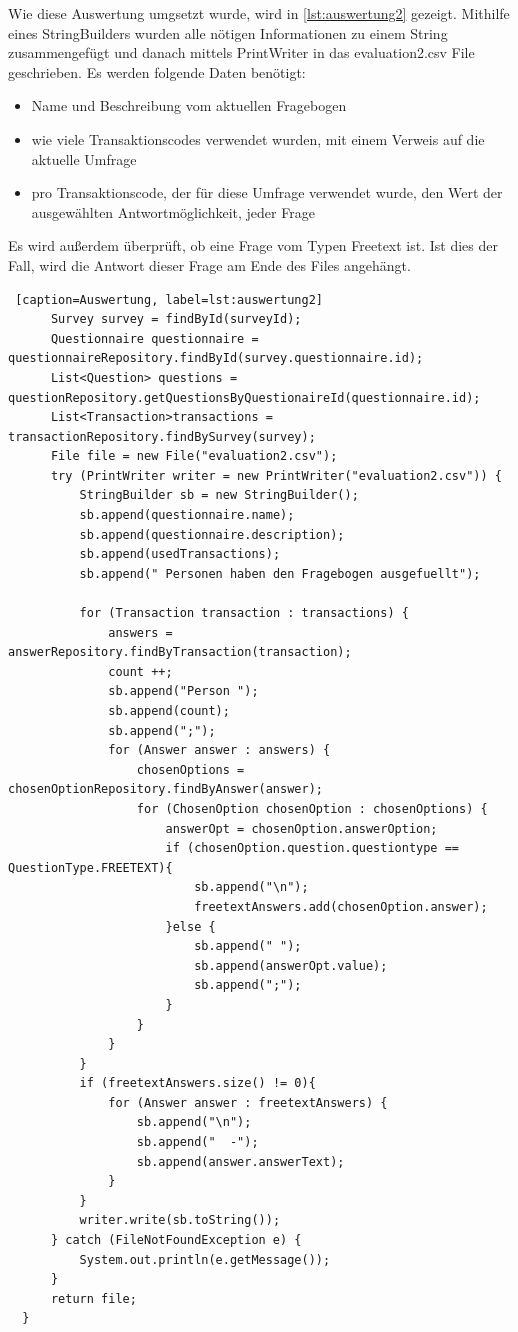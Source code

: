 Wie diese Auswertung umgsetzt wurde, wird in \ref{lst:auswertung2} gezeigt.
Mithilfe eines StringBuilders wurden alle nötigen Informationen zu einem String zusammengefügt und danach
mittels PrintWriter in das evaluation2.csv File geschrieben. Es werden folgende Daten benötigt:
\begin{itemize}
  \item Name und Beschreibung vom aktuellen Fragebogen
  \item wie viele Transaktionscodes verwendet wurden, mit einem Verweis auf die aktuelle Umfrage
  \item pro Transaktionscode, der für diese Umfrage verwendet wurde, den Wert der ausgewählten Antwortmöglichkeit, jeder Frage
\end{itemize}
Es wird außerdem überprüft, ob eine Frage vom Typen Freetext ist. Ist dies der Fall, wird die Antwort dieser Frage
am Ende des Files angehängt.
  \begin{lstlisting} [caption=Auswertung, label=lst:auswertung2]
      Survey survey = findById(surveyId);
      Questionnaire questionnaire = questionnaireRepository.findById(survey.questionnaire.id);
      List<Question> questions = questionRepository.getQuestionsByQuestionaireId(questionnaire.id);
      List<Transaction>transactions = transactionRepository.findBySurvey(survey);
      File file = new File("evaluation2.csv");
      try (PrintWriter writer = new PrintWriter("evaluation2.csv")) {
          StringBuilder sb = new StringBuilder();
          sb.append(questionnaire.name);
          sb.append(questionnaire.description);
          sb.append(usedTransactions);
          sb.append(" Personen haben den Fragebogen ausgefuellt");
        
          for (Transaction transaction : transactions) {
              answers = answerRepository.findByTransaction(transaction);
              count ++;
              sb.append("Person ");
              sb.append(count);
              sb.append(";");
              for (Answer answer : answers) {
                  chosenOptions = chosenOptionRepository.findByAnswer(answer);
                  for (ChosenOption chosenOption : chosenOptions) {
                      answerOpt = chosenOption.answerOption;
                      if (chosenOption.question.questiontype == QuestionType.FREETEXT){
                          sb.append("\n");
                          freetextAnswers.add(chosenOption.answer);
                      }else {
                          sb.append(" ");
                          sb.append(answerOpt.value);
                          sb.append(";");
                      }
                  }
              }
          }
          if (freetextAnswers.size() != 0){
              for (Answer answer : freetextAnswers) {
                  sb.append("\n");
                  sb.append("  -");
                  sb.append(answer.answerText);
              }
          }
          writer.write(sb.toString());
      } catch (FileNotFoundException e) {
          System.out.println(e.getMessage());
      }
      return file;
  }
  \end{lstlisting}
